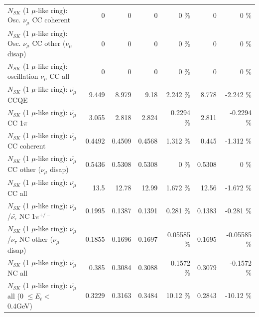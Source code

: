 \begin{table}
\begin{tabular}{| l | r | r | r  r | r  r |}
                        $N_{SK}$ (1 $\mu$-like ring): Osc. $\nu_\mu$ CC coherent &               0 &               0 &               0 &        0 \%  &               0 &        0 \%  \\ 
         $N_{SK}$ (1 $\mu$-like ring): Osc. $\nu_\mu$ CC other ($\nu_\mu$ disap) &               0 &               0 &               0 &        0 \%  &               0 &        0 \%  \\ 
                      $N_{SK}$ (1 $\mu$-like ring): oscillation $\nu_\mu$ CC all &               0 &               0 &               0 &        0 \%  &               0 &        0 \%  \\ 
\hline
\hline
                              $N_{SK}$ (1 $\mu$-like ring): $\bar{\nu_\mu}$ CCQE &           9.449 &           8.979 &            9.18 &    2.242 \%  &           8.778 &   -2.242 \%  \\ 
                         $N_{SK}$ (1 $\mu$-like ring): $\bar{\nu_\mu}$ CC 1$\pi$ &           3.055 &           2.818 &           2.824 &   0.2294 \%  &           2.811 &  -0.2294 \%  \\ 
                       $N_{SK}$ (1 $\mu$-like ring): $\bar{\nu_\mu}$ CC coherent &          0.4492 &          0.4509 &          0.4568 &    1.312 \%  &           0.445 &   -1.312 \%  \\ 
        $N_{SK}$ (1 $\mu$-like ring): $\bar{\nu_\mu}$ CC other ($\nu_\mu$ disap) &          0.5436 &          0.5308 &          0.5308 &        0 \%  &          0.5308 &        0 \%  \\ 
                          $N_{SK}$ (1 $\mu$-like ring): $\bar{\nu_{\mu}}$ CC all &            13.5 &           12.78 &           12.99 &    1.672 \%  &           12.56 &   -1.672 \%  \\ 
\hline
  $N_{SK}$ (1 $\mu$-like ring): $\bar{\nu_\mu}$/$\bar{\nu_\tau}$ NC 1$\pi^{+/-}$ &          0.1995 &          0.1387 &          0.1391 &    0.281 \%  &          0.1383 &   -0.281 \%  \\ 
$N_{SK}$ (1 $\mu$-like ring): $\bar{\nu_\mu}$/$\bar{\nu_\tau}$ NC other ($\nu_\mu$ disap) &          0.1855 &          0.1696 &          0.1697 &  0.05585 \%  &          0.1695 & -0.05585 \%  \\ 
                          $N_{SK}$ (1 $\mu$-like ring): $\bar{\nu_{\mu}}$ NC all &           0.385 &          0.3084 &          0.3088 &   0.1572 \%  &          0.3079 &  -0.1572 \%  \\ 
\hline
   $N_{SK}$ (1 $\mu$-like ring): $\bar{\nu_{\mu}}$ all (0 $\leq E_{t} <$ 0.4GeV) &          0.3229 &          0.3163 &          0.3484 &    10.12 \%  &          0.2843 &   -10.12 \%  \\ 

\end{tabular}
\end{table}
